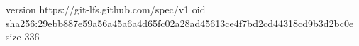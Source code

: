 version https://git-lfs.github.com/spec/v1
oid sha256:29ebb887e59a56a45a6a4d65fc02a28ad45613ce4f7bd2cd44318cd9b3d2bc0e
size 336
